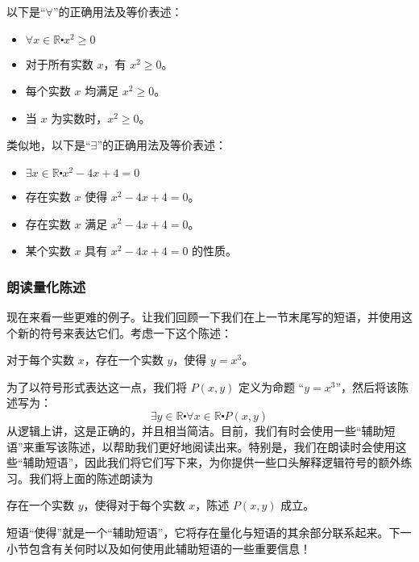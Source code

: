 \begin{example}
    以下是``$\forall$''的正确用法及等价表述：
    \begin{itemize}
        \item $\forall x \in \mathbb{R} \centerdot x^2 \ge 0$
        \item 对于所有实数 $x$，有 $x^2 \ge 0$。
        \item 每个实数 $x$ 均满足 $x^2 \ge 0$。
        \item 当 $x$ 为实数时，$x^2 \ge 0$。
    \end{itemize}
    类似地，以下是``$\exists$''的正确用法及等价表述：
    \begin{itemize}
        \item $\exists x \in \mathbb{R} \centerdot x^2 - 4x + 4 = 0$
        \item 存在实数 $x$ 使得 $x^2 - 4x + 4 = 0$。
        \item 存在实数 $x$ 满足 $x^2 - 4x + 4 = 0$。
        \item 某个实数 $x$ 具有 $x^2 - 4x + 4 = 0$ 的性质。
    \end{itemize}
\end{example}

\subsubsection*{朗读量化陈述}

\begin{example}
    现在来看一些更难的例子。让我们回顾一下我们在上一节末尾写的短语，并使用这个新的符号来表达它们。考虑一下这个陈述：
    \begin{center}
        对于每个实数 $x$，存在一个实数 $y$，使得 $y = x^3$。
    \end{center}
    为了以符号形式表达这一点，我们将 $P(x, y)$ 定义为命题 ``$y = x^3$''，然后将该陈述写为：
    \[\exists y \in \mathbb{R} \centerdot \forall x \in \mathbb{R} \centerdot P(x, y)\]
    从逻辑上讲，这是正确的，并且相当简洁。目前，我们有时会使用一些``辅助短语''来重写该陈述，以帮助我们更好地阅读出来。特别是，我们在朗读时会使用这些``辅助短语''，因此我们将它们写下来，为你提供一些口头解释逻辑符号的额外练习。我们将上面的陈述朗读为
    \begin{center}
        存在一个实数 $y$，使得对于每个实数 $x$，陈述 $P(x, y)$ 成立。
    \end{center}
    短语``使得''就是一个``辅助短语''，它将存在量化与短语的其余部分联系起来。下一小节包含有关何时以及如何使用此辅助短语的一些重要信息！
\end{example}

